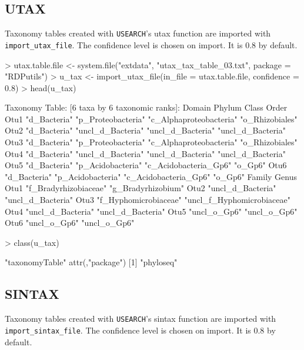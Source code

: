 \documentclass{article}
\begin{document}
\subsection*{UTAX}

Taxonomy tables created with \texttt{USEARCH}'s utax function are imported with \texttt{import\_utax\_file}. The confidence level is chosen on import. It is 0.8 by default.  

\begin{Schunk}
\begin{Sinput}
> utax.table.file <- system.file("extdata", "utax_tax_table_03.txt", package = "RDPutils")
> u_tax <- import_utax_file(in_file = utax.table.file, confidence = 0.8)
> head(u_tax)
\end{Sinput}
\begin{Soutput}
Taxonomy Table:     [6 taxa by 6 taxonomic ranks]:
     Domain       Phylum             Class                   Order            
Otu1 "d_Bacteria" "p_Proteobacteria" "c_Alphaproteobacteria" "o_Rhizobiales"  
Otu2 "d_Bacteria" "uncl_d_Bacteria"  "uncl_d_Bacteria"       "uncl_d_Bacteria"
Otu3 "d_Bacteria" "p_Proteobacteria" "c_Alphaproteobacteria" "o_Rhizobiales"  
Otu4 "d_Bacteria" "uncl_d_Bacteria"  "uncl_d_Bacteria"       "uncl_d_Bacteria"
Otu5 "d_Bacteria" "p_Acidobacteria"  "c_Acidobacteria_Gp6"   "o_Gp6"          
Otu6 "d_Bacteria" "p_Acidobacteria"  "c_Acidobacteria_Gp6"   "o_Gp6"          
     Family                Genus                     
Otu1 "f_Bradyrhizobiaceae" "g_Bradyrhizobium"        
Otu2 "uncl_d_Bacteria"     "uncl_d_Bacteria"         
Otu3 "f_Hyphomicrobiaceae" "uncl_f_Hyphomicrobiaceae"
Otu4 "uncl_d_Bacteria"     "uncl_d_Bacteria"         
Otu5 "uncl_o_Gp6"          "uncl_o_Gp6"              
Otu6 "uncl_o_Gp6"          "uncl_o_Gp6"              
\end{Soutput}
\begin{Sinput}
> class(u_tax)
\end{Sinput}
\begin{Soutput}
[1] "taxonomyTable"
attr(,"package")
[1] "phyloseq"
\end{Soutput}
\end{Schunk}

\subsection*{SINTAX}

Taxonomy tables created with \texttt{USEARCH}'s sintax function are imported with \texttt{import\_sintax\_file}. The confidence level is chosen on import. It is 0.8 by default.  
\end{document}
